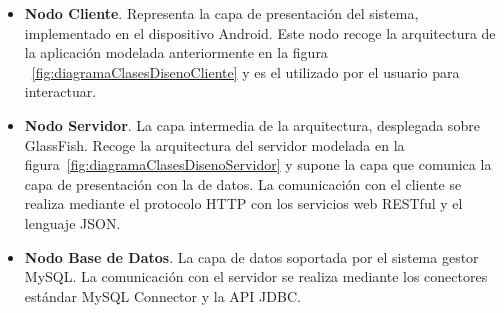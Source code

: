 \begin{itemize}
	\item{\textbf{Nodo Cliente}. Representa la capa de presentación del sistema, implementado en el dispositivo Android. Este nodo recoge la arquitectura de la aplicación modelada anteriormente en la figura ~\ref{fig:diagramaClasesDisenoCliente} y es el utilizado por el usuario para interactuar}.	
	\item{\textbf{Nodo Servidor}. La capa intermedia de la arquitectura, desplegada sobre GlassFish. Recoge la arquitectura del servidor modelada en la figura~\ref{fig:diagramaClasesDisenoServidor} y supone la capa que comunica la capa de presentación con la de datos. La comunicación con el cliente se realiza mediante el protocolo HTTP con los servicios web RESTful y el lenguaje JSON}.
	\item{\textbf{Nodo Base de Datos}. La capa de datos soportada por el sistema gestor MySQL. La comunicación con el servidor se realiza mediante los conectores estándar MySQL Connector y la API JDBC}.
\end{itemize}
